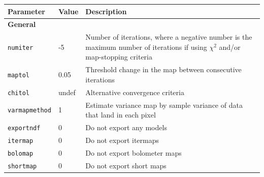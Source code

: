 \documentclass[twoside,11pt]{article}
\renewcommand{\_}{\texttt{\symbol{95}}}
\newcommand{\param}[1]{\texttt{#1}}
\begin{document}
\begin{htmlonly}
\begin{table}
\begin{center}
\begin{small}
\begin{tabular}{|p{2.2cm}|p{1.1cm}|p{11.4cm}|}
\hline
Parameter & Value & Description \\
\hline
\multicolumn{3}{|l|}{\textbf{General}}\\
\hline
\param{numiter}       &   -5 & Number of iterations, where a negative number
                               is the maximum number of iterations
                               if using $\chi^2$ and/or map-stopping criteria \\
\param{maptol}        & 0.05 & Threshold change in the map between consecutive
                               iterations \\
\param{chitol}        & undef& Alternative convergence criteria \\
\param{varmapmethod}  &    1 & Estimate variance map by sample variance of data that
                               land in each pixel \\

\param{exportndf}     &    0 & Do not export any models \\
\param{itermap}       &    0 & Do not export itermaps \\
\param{bolomap}       &    0 & Do not export bolometer maps \\
\param{shortmap}      &    0 & Do not export short maps \\


\end{tabular}
\end{small}
\end{center}
\end{table}
\end{htmlonly}
\end{document}
